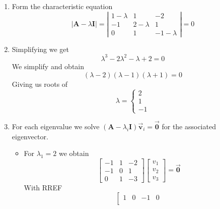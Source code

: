 \documentclass[12pt, landscape, twocolumn]{article}
\newcommand{\ma}[0]{\mathbf{A} }        %
\let\oldvec\vec
\renewcommand{\vec}[1]{\oldvec{\mathbf{ #1 } } }                    %
\begin{document}
        \begin{enumerate}
            \item Form the characteristic equation
                \[
                    \lvert \ma - \lambda \mathbf{I} \rvert = 
                    \left| \begin{array}{rrr}
                        1 - \lambda & 1 & -2\\
                        -1 & 2 - \lambda & 1\\
                        0 & 1 & -1 - \lambda
                    \end{array} \right|  = 0 \]
            \item Simplifying we get
                \[ \lambda^3 - 2 \lambda^2 - \lambda + 2 = 0 \]
                We simplify and obtain
                \[ (\lambda - 2)(\lambda - 1)(\lambda + 1) = 0 \]
                Giving us roots of
                \[ \boxed{\lambda = \begin{cases}
                    2\\
                    1\\
                    -1
                \end{cases} } \]
            \item For each eigenvalue we solve $( \ma - \lambda_i \mathbf{I}) \vec{v}_i = \vec{0}$ for the associated eigenvector.
                \begin{itemize}
                    \item For $\lambda_1 = 2$ we obtain
                        \[
                            \left[ \begin{array}{rrr}
                                -1 & 1 & -2\\
                                -1 & 0 & 1\\
                                0 & 1 & -3
                            \end{array} \right]
                            \left[ \begin{array}{r}
                                v_1\\ v_2\\ v_3
                            \end{array} \right]
                            = \vec{0}
                        \]
                        With RREF
                        \[
                            \left[ \begin{array}{rrr|r}
                                1 & 0 & -1 & 0\\

\end{array}\]
\end{itemize}
\end{enumerate}
\end{document}
